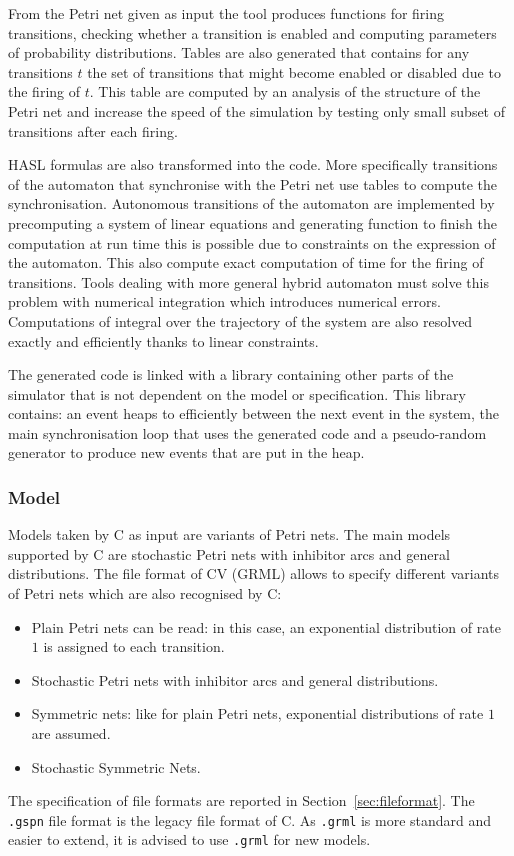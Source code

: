 \documentclass{article}
\newcommand{\cosmos}{\mbox{\textup{C}\scalebox{0.75}{{\textsc{OSMOS}}}}}
\newcommand{\cosyverif}{\mbox{\textup{C}\scalebox{0.75}{{\textsc{OSY}}}\textup{V}\scalebox{0.75}{{\textsc{ERIF}}}}}
\begin{document}
From the Petri net given as input the tool produces functions for
firing transitions, checking whether a transition is enabled and
computing parameters of probability distributions. Tables are also
generated that contains for any transitions $t$ the set of transitions
that might become enabled or disabled due to the firing of $t$. This
table are computed by an analysis of the structure of the Petri net
and increase the speed of the simulation by testing only small subset of
transitions after each firing.

HASL formulas are also transformed into the code. More specifically
transitions of the automaton that synchronise with the Petri net use
tables to compute the synchronisation. Autonomous transitions of the
automaton are implemented by precomputing a system of linear equations
and generating function to finish the computation at run time this is
possible due to constraints on the expression of the automaton. This
also compute exact computation of time for the firing of
transitions. Tools dealing with more general hybrid automaton must
solve this problem with numerical integration which introduces
numerical errors. Computations of integral over the trajectory of the
system are also resolved exactly and efficiently thanks to linear
constraints.

The generated code is linked with a library containing other parts
of the simulator that is not dependent on the model or specification.
This library contains: an event heaps to efficiently between the next event
in the system, the main synchronisation loop that uses the generated code
and a pseudo-random generator to produce new events that are put in the heap.

\subsubsection{Model}
Models taken by \cosmos{} as input are variants of Petri nets.  The main
models supported by \cosmos{} are stochastic Petri nets with inhibitor
arcs and general distributions. The file format of \cosyverif{} (GRML) 
allows to specify different variants of Petri nets which are also 
recognised by \cosmos{}:
\begin{itemize}
\item Plain Petri nets can be read: in this case, an exponential
  distribution of rate $1$ is assigned to each transition.
\item Stochastic Petri nets with inhibitor arcs and general distributions.
\item Symmetric nets: like for plain Petri nets, exponential
  distributions of rate $1$ are assumed.
\item Stochastic Symmetric Nets. 
\end{itemize}
The specification of file formats are reported in Section~\ref{sec:fileformat}.
The \verb|.gspn| file format is the legacy file format of \cosmos{}. As \verb|.grml|
is more standard and easier to extend, it is advised to use \verb|.grml| for new
models.
\end{document}
